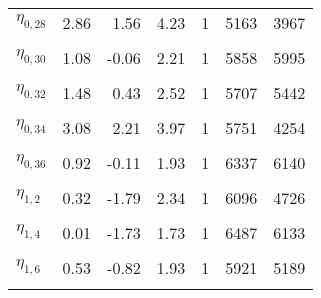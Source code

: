 \begin{longtable}[t]{lrrrrrr}
$\eta_{0, 28}$ & 2.86 & 1.56 & 4.23 & 1 & 5163 & 3967\\
\cellcolor{gray!6}{$\eta_{0, 29}$} & \cellcolor{gray!6}{1.65} & \cellcolor{gray!6}{1.01} & \cellcolor{gray!6}{2.29} & \cellcolor{gray!6}{1} & \cellcolor{gray!6}{5895} & \cellcolor{gray!6}{4268}\\
$\eta_{0, 30}$ & 1.08 & -0.06 & 2.21 & 1 & 5858 & 5995\\
\cellcolor{gray!6}{$\eta_{0, 31}$} & \cellcolor{gray!6}{2.32} & \cellcolor{gray!6}{1.17} & \cellcolor{gray!6}{3.46} & \cellcolor{gray!6}{1} & \cellcolor{gray!6}{4239} & \cellcolor{gray!6}{2892}\\
$\eta_{0, 32}$ & 1.48 & 0.43 & 2.52 & 1 & 5707 & 5442\\
\cellcolor{gray!6}{$\eta_{0, 33}$} & \cellcolor{gray!6}{3.94} & \cellcolor{gray!6}{2.67} & \cellcolor{gray!6}{5.19} & \cellcolor{gray!6}{1} & \cellcolor{gray!6}{4882} & \cellcolor{gray!6}{2769}\\
$\eta_{0, 34}$ & 3.08 & 2.21 & 3.97 & 1 & 5751 & 4254\\
\cellcolor{gray!6}{$\eta_{0, 35}$} & \cellcolor{gray!6}{1.52} & \cellcolor{gray!6}{0.38} & \cellcolor{gray!6}{2.61} & \cellcolor{gray!6}{1} & \cellcolor{gray!6}{5114} & \cellcolor{gray!6}{2660}\\
$\eta_{0, 36}$ & 0.92 & -0.11 & 1.93 & 1 & 6337 & 6140\\
\cellcolor{gray!6}{$\eta_{1, 1}$} & \cellcolor{gray!6}{0.44} & \cellcolor{gray!6}{-1.11} & \cellcolor{gray!6}{1.97} & \cellcolor{gray!6}{1} & \cellcolor{gray!6}{4600} & \cellcolor{gray!6}{5035}\\
$\eta_{1, 2}$ & 0.32 & -1.79 & 2.34 & 1 & 6096 & 4726\\
\cellcolor{gray!6}{$\eta_{1, 3}$} & \cellcolor{gray!6}{2.17} & \cellcolor{gray!6}{0.43} & \cellcolor{gray!6}{3.94} & \cellcolor{gray!6}{1} & \cellcolor{gray!6}{5630} & \cellcolor{gray!6}{4928}\\
$\eta_{1, 4}$ & 0.01 & -1.73 & 1.73 & 1 & 6487 & 6133\\
\cellcolor{gray!6}{$\eta_{1, 5}$} & \cellcolor{gray!6}{-0.72} & \cellcolor{gray!6}{-2.64} & \cellcolor{gray!6}{1.11} & \cellcolor{gray!6}{1} & \cellcolor{gray!6}{5809} & \cellcolor{gray!6}{3579}\\
$\eta_{1, 6}$ & 0.53 & -0.82 & 1.93 & 1 & 5921 & 5189\\
\cellcolor{gray!6}{$\eta_{1, 7}$} & \cellcolor{gray!6}{2.54} & \cellcolor{gray!6}{0.20} & \cellcolor{gray!6}{5.28} & \cellcolor{gray!6}{1} & \cellcolor{gray!6}{5798} & \cellcolor{gray!6}{6369}\\

\end{longtable}
